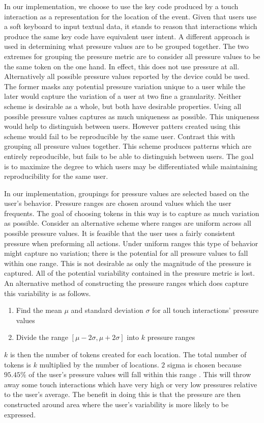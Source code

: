 In our implementation,
we choose to use the key code produced by 
a touch interaction as a representation 
for the location of the event.
Given that users use a soft keyboard to input
textual data, it stands to reason that
interactions which produce the same key code have equivalent user intent.
%
A different approach is used in determining
what pressure values are to be grouped together.
The two extremes for grouping the pressure metric 
are to consider all pressure values to be the same token on the one hand.
In effect, this does not use pressure at all.
Alternatively all possible pressure values reported
by the device could be used.
The former masks any potential pressure variation unique to a user while
the later would capture the variation of a user at two fine a granularity.
Neither scheme is desirable as a whole, but both have desirable properties.
%
Using all possible pressure values captures
as much uniqueness as possible.
This uniqueness would help to distinguish between users.
However patters created using this scheme would 
fail to be reproducible by the same user.
Contrast this with grouping all pressure values together. 
This scheme produces patterns which are entirely reproducible, but
fails to be able to distinguish between users.
%
The goal is to maximize the degree to which users
may be differentiated while maintaining
reproducibility for the same user.

In our implementation,
groupings for pressure values are selected based on the user's behavior.
Pressure ranges are chosen around values which the user frequents.
The goal of choosing tokens in this way is to capture
as much variation as possible.
%
Consider an alternative scheme where ranges are
uniform across all possible pressure values.
It is feasible that the user uses a fairly consistent
pressure when preforming all actions.
Under uniform ranges this type of behavior might 
capture no variation; there is the potential
for all pressure values to fall within one range.
This is not desirable as 
only the magnitude of the pressure is captured.
All of the potential variability contained
in the pressure metric is lost.
%
An alternative method of constructing
the pressure ranges which does capture 
this variability is as follows.
\begin{enumerate}
\item Find the mean $\mu$ and standard deviation $\sigma$ 
  for all touch interactions' pressure values
\item Divide the range $[\mu-2\sigma, \mu+2\sigma]$ into $k$ pressure ranges
\end{enumerate}
%
$k$ is then the number of tokens created for each location.
The total number of tokens is $k$ multiplied by the number of locations.
$2$ sigma is chosen because $95.45\%$ of the user's pressure values
will fall within this range
\cite{threesigmarule}.
This will throw away some touch interactions
which have very high or very low pressures
relative to the user's average.
The benefit in doing this is
that the pressure are then constructed around
area where the user's variability is more likely to be expressed. %

